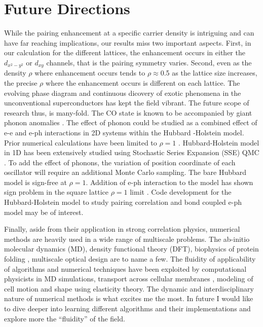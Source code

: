 \documentclass[a4paper,12pt]{article}
\begin{document}
\section{Future Directions}
While the pairing enhancement at a specific carrier density is intriguing and can have far reaching implications,
our results miss two important aspects. First, in our calculation for the different lattices, the enhancement occurs in either the 
$d_{x^2-y^2}$ or $d_{xy}$ channels, that is the pairing symmetry varies. Second, even as the density $\rho$ where enhancement occurs tends to $\rho \approx$0.5
as the lattice size increases, the precise $\rho$ where the enhancement occurs is different on each lattice. 
The evolving phase diagram and continuous dicovery of exotic phenomena in the unconventional superconductors has kept the field vibrant. 
The future scope of research thus, is many-fold. 
The CO state is known to be accompanied by giant phonon anomalies \cite{liu15a}. The effect of phonon
could be studied as a combined effect of e-e and e-ph interactions in 2D systems within the Hubbard -Holstein model. 
Prior numerical calculations have been limited to $\rho=1$  \cite{johnston13a,nowadnick12a}. Hubbard-Holstein model in 1D has been extensively
studied using Stochastic Series Expansion (SSE) QMC \cite{clay05a,hardikar07a}. To add the effect of phonons, the variation of
position coordinate of each oscillator will require an additional Monte Carlo sampling. The bare Hubbard model is 
sign-free at $\rho=1$. Addition of e-ph interaction to the model has shown sign problem in the square lattice $\rho=1$ limit \cite{johnston13a}. 
Code development for the Hubbard-Holstein model to study pairing correlation and bond coupled e-ph model may be of interest.   


Finally, aside from their application in strong correlation physics, numerical methods 
are heavily used in a wide range of multiscale problems. The ab-initio molecular dynamics (MD), density functional theory (DFT),
biophysics of protein folding \cite{nolting05a,scheraga07a}, 
multiscale optical design \cite{milojkovic15a}
are to name a few. The fluidity of applicability of algorithms and numerical techniques 
have been exploited by computational physicists in MD simulations\cite{marx96a,guglielmo17a}, transport across cellular membranes
\cite{adelman16,veshaguri16}, modeling of cell motion and shape using elasticity theory\cite{goldstein00}.
The dynamic and interdisciplinary nature of numerical methods is what excites me the most.
In future I would like to dive deeper into learning different algorithms and their implementations and explore more
the ``fluidity'' of the field.  
    
%

  
\end{document}
